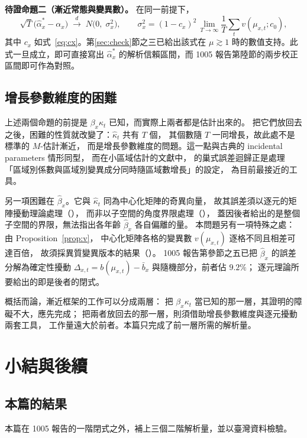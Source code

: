 \documentclass[UTF8, fontset=macnew, a4paper, 12pt]{ctexart}
\begin{document}
\textbf{待證命題二（漸近常態與變異數）。}
在同一前提下，
\[
\sqrt{T}\bigl(\hat\alpha^{\ast}_x-\alpha_x\bigr)
\;\xrightarrow{\;d\;}\;N\bigl(0,\;\sigma^{2}_x\bigr),
\qquad
\sigma^{2}_x=(1-c_x)^{2}\,\lim_{T\to\infty}\frac{1}{T}\sum_t v(\mu_{x,t};c_0),
\]
其中 $c_x$ 如式~\eqref{eq:cx}。第\ref{sec:check}節之三已給出該式在
$\mu\gtrsim1$ 時的數值支持。此式一旦成立，即可直接寫出 $\hat\alpha^{\ast}_x$
的解析信賴區間，而 1005 報告第陸節的兩步校正區間即可作為對照。

\subsection{增長參數維度的困難}

上述兩個命題的前提是 $\beta_x\kappa_t$ 已知，而實際上兩者都是估計出來的。
把它們放回去之後，困難的性質就改變了：$\hat\kappa_t$ 共有 $T$ 個，
其個數隨 $T$ 一同增長，故此處不是標準的 $M$-估計漸近，
而是增長參數維度的問題。這一點與古典的 incidental parameters 情形同型，
而在小區域估計的文獻中，\citet{lahiri2023} 的巢式誤差迴歸正是處理
「區域別係數與區域別變異成分同時隨區域數增長」的設定，
為目前最接近的工具。

另一項困難在 $\hat\beta_x$。它與 $\hat\kappa_t$ 同為中心化矩陣的奇異向量，
故其誤差須以逐元的矩陣擾動理論處理（\citealp{abbe2020}），
而非以子空間的角度界限處理（\citealp{caizhang2018}），
蓋因後者給出的是整個子空間的界限，無法指出各年齡 $\hat\beta_x$ 各自偏離的量。
本問題另有一項特殊之處：由 Proposition~\ref{prop:v}，
中心化矩陣各格的變異數 $v(\mu_{x,t})$ 逐格不同且相差可達百倍，
故須採異質變異版本的結果（\citealp{zhang2022}）。
1005 報告第參節之五已把 $\hat\beta_x$ 的誤差分解為確定性擾動
$\Delta_{x,t}=b(\mu_{x,t})-\bar b_x$ 與隨機部分，前者佔 $9.2\%$；
逐元理論所要給出的即是後者的閉式。

概括而論，漸近框架的工作可以分成兩層：
把 $\beta_x\kappa_t$ 當已知的那一層，其證明的障礙不大，應先完成；
把兩者放回去的那一層，則須借助增長參數維度與逐元擾動兩套工具，
工作量遠大於前者。本篇只完成了前一層所需的解析量。

\section{小結與後續}\label{sec:next}

\subsection{本篇的結果}

本篇在 1005 報告的一階閉式之外，補上三個二階解析量，並以臺灣資料檢驗。
\end{document}
